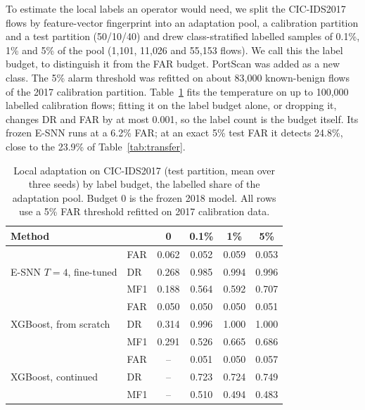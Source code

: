 \documentclass[conference]{IEEEtran}
\begin{document}
To estimate the local labels an operator would need, we split the CIC-IDS2017 flows by feature-vector fingerprint into an adaptation pool, a calibration partition and a test partition (50/10/40) and drew class-stratified labelled samples of 0.1\%, 1\% and 5\% of the pool (1{,}101, 11{,}026 and 55{,}153 flows). We call this the label budget, to distinguish it from the FAR budget. PortScan was added as a new class. The 5\% alarm threshold was refitted on about 83{,}000 known-benign flows of the 2017 calibration partition. Table~\ref{tab:adapt} fits the temperature on up to 100{,}000 labelled calibration flows; fitting it on the label budget alone, or dropping it, changes DR and FAR by at most 0.001, so the label count is the budget itself. Its frozen E-SNN runs at a 6.2\% FAR; at an exact 5\% test FAR it detects 24.8\%, close to the 23.9\% of Table~\ref{tab:transfer}.

\begin{table}[t]
\centering
\caption{Local adaptation on CIC-IDS2017 (test partition, mean over three seeds) by label budget, the labelled share of the adaptation pool. Budget 0 is the frozen 2018 model. All rows use a 5\% FAR threshold refitted on 2017 calibration data.}
\label{tab:adapt}
\setlength{\tabcolsep}{3pt}
\begin{tabular}{llcccc}
\toprule
Method & & 0 & 0.1\% & 1\% & 5\% \\
\midrule
\multirow{3}{*}{E-SNN $T{=}4$, fine-tuned} & FAR & 0.062 & 0.052 & 0.059 & 0.053 \\
 & DR & 0.268 & 0.985 & 0.994 & 0.996 \\
 & MF1 & 0.188 & 0.564 & 0.592 & 0.707 \\
\midrule
\multirow{3}{*}{XGBoost, from scratch} & FAR & 0.050 & 0.050 & 0.050 & 0.051 \\
 & DR & 0.314 & 0.996 & 1.000 & 1.000 \\
 & MF1 & 0.291 & 0.526 & 0.665 & 0.686 \\
\midrule
\multirow{3}{*}{XGBoost, continued} & FAR & -- & 0.051 & 0.050 & 0.057 \\
 & DR & -- & 0.723 & 0.724 & 0.749 \\
 & MF1 & -- & 0.510 & 0.494 & 0.483 \\
\bottomrule
\end{tabular}
\end{table}
\end{document}
